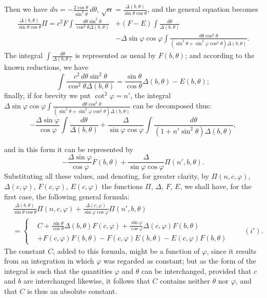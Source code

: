 \documentclass{article}
\begin{document}
Then we have $dn=-\frac{2\cos\theta}{\sin^{3}\theta}\,d\theta$, $\sqrt{\alpha}=\frac{\Delta(b,\theta)}{\sin\theta\cos\theta}$, and the general equation becomes
\[ \begin{aligned} \frac{\Delta(b,\theta)}{\sin\theta\cos\theta}\Pi=c^{2}F\int\frac{d\theta\sin^{2}\theta}{\cos^{2}\theta\Delta(b,\theta)}&+(F-E)\int\frac{d\theta}{\Delta(b,\theta)}\\ &-\Delta\sin\varphi\cos\varphi\int\frac{d\theta\cos^{2}\theta}{(\sin^{2}\theta+\sin^{2}\varphi\cos^{2}\theta)\Delta(b,\theta)}. \end{aligned} \]
The integral $\displaystyle\int\frac{d\theta}{\Delta(b,\theta)}$ is represented as usual by $F(b,\theta)$; and according to the known reductions, we have
\[ \int\frac{c^{2}\,d\theta\sin^{2}\theta}{\cos^{2}\theta\Delta(b,\theta)}=\frac{\sin\theta}{\cos\theta}\Delta(b,\theta)-E(b,\theta); \]
finally, if for brevity we put $\cot^{2}\varphi=n'$, the integral $\Delta\sin\varphi\cos\varphi\displaystyle\int\frac{d\theta\cos^{2}\theta}{(\sin^{2}\theta+\sin^{2}\varphi\cos^{2}\theta)\Delta(b,\theta)}$ can be decomposed thus:
\[ -\frac{\Delta\sin\varphi}{\cos\varphi}\int\frac{d\theta}{\Delta(b,\theta)}+\frac{\Delta}{\sin\varphi\cos\varphi}\int\frac{d\theta}{(1+n'\sin^{2}\theta)\Delta(b,\theta)}, \]

and in this form it can be represented by
\[ -\frac{\Delta\sin\varphi}{\cos\varphi}F(b,\theta)+\frac{\Delta}{\sin\varphi\cos\varphi}\Pi(n',b,\theta). \]
Substituting all these values, and denoting, for greater clarity, by $\Pi(n,c,\varphi)$, $\Delta(c,\varphi)$, $F(c,\varphi)$, $E(c,\varphi)$ the functions $\Pi$, $\Delta$, $F$, $E$, we shall have, for the first case, the following general formula:
\[ \begin{aligned} &\frac{\Delta(b,\theta)}{\sin\theta\cos\theta}\Pi(n,c,\varphi)+\frac{\Delta(c,\varphi)}{\sin\varphi\cos\varphi}\Pi(n',b,\theta)\\ &=\left\{\begin{aligned} &C+\frac{\sin\theta}{\cos\theta}\Delta(b,\theta)F(c,\varphi)+\frac{\sin\varphi}{\cos\varphi}\Delta(c,\varphi)F(b,\theta)\\ &+F(c,\varphi)F(b,\theta)-F(c,\varphi)E(b,\theta)-E(c,\varphi)F(b,\theta) \end{aligned}\right.\qquad(i'). \end{aligned} \]
The constant $C$, added to this formula, might be a function of $\varphi$, since it results from an integration in which $\varphi$ was regarded as constant; but as the form of the integral is such that the quantities $\varphi$ and $\theta$ can be interchanged, provided that $c$ and $b$ are interchanged likewise, it follows that $C$ contains neither $\theta$ nor $\varphi$, and that $C$ is thus an absolute constant.
\end{document}
